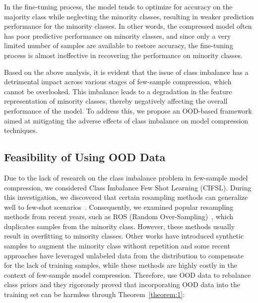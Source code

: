 \documentclass[twoside,11pt]{article}
\begin{document}
In the fine-tuning process, the model tends to optimize for accuracy on the majority class while neglecting the minority classes, resulting in weaker prediction performance for the minority classes. In other words, the compressed model often has poor predictive performance on minority classes, and since only a very limited number of samples are available to restore accuracy, the fine-tuning process is almost ineffective in recovering the performance on minority classes.

Based on the above analysis, it is evident that the issue of class imbalance has a detrimental impact across various stages of few-sample compression, which cannot be overlooked. This imbalance leads to a degradation in the feature representation of minority classes, thereby negatively affecting the overall performance of the model. To address this, we propose an OOD-based framework aimed at mitigating the adverse effects of class imbalance on model compression techniques.

\subsection{Feasibility of Using OOD Data
}

Due to the lack of research on the class imbalance problem in few-sample model compression, we considered 
Class Imbalance Few Shot Learning (CIFSL). During this investigation, we discovered that certain resampling methods can generalize well to few-shot scenarios~\citep{ochal2023few}. Consequently, we examined popular resampling methods from recent years, such as ROS (Random Over-Sampling)~\citep{japkowicz2002class}, which duplicates samples from the minority class. However, these methods usually result in overfitting to minority classes. Other works have introduced synthetic samples to augment the minority class without repetition \citep{chawla2002smote} and some recent approaches have leveraged unlabeled data from the distribution to compensate for the lack of training samples, while these methods are highly costly in the context of few-sample model compression. Therefore, \citet{wei2022open} use OOD data to rebalance class priors and they rigorously proved that incorporating OOD data into the training set can be harmless through Theorem~\ref{theorem:1}:

\end{document}
